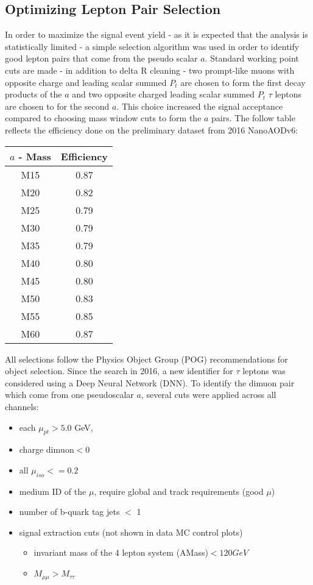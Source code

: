 \subsection{Optimizing Lepton Pair Selection}
In order to maximize the signal event yield - as it is expected that the analysis is statistically limited - a simple selection algorithm was used in order to identify good lepton pairs that come from the pseudo scalar $a$. Standard working point cuts are made - in addition to delta R cleaning - two prompt-like muons with opposite charge and leading scalar summed $P_t$ are chosen to form the first decay products of the $a$ and two opposite charged leading scalar summed $P_t$ $\tau$ leptons are chosen to for the second $a$. This choice increased the signal acceptance compared to choosing mass window cuts to form the $a$ pairs. The follow table reflects the efficiency done on the preliminary dataset from 2016 NanoAODv6:
\begin{center}
\begin{tabular}{|c|c|}\hline
$a$ - Mass & Efficiency \\\hline
M15 & 0.87 \\\hline
M20 & 0.82 \\\hline
M25 & 0.79 \\\hline
M30 & 0.79 \\\hline
M35 & 0.79 \\\hline
M40 & 0.80 \\\hline
M45 & 0.80 \\\hline
M50 & 0.83 \\\hline
M55 & 0.85 \\\hline
M60 & 0.87 \\\hline
\end{tabular}
\end{center}

All selections follow the Physics Object Group (POG) recommendations for object selection.
Since the search in 2016, a new identifier for $\tau$ leptons was considered using a Deep Neural Network (DNN).
To identify the dimuon pair which come from one pseudoscalar $a$, several cuts were applied across all channels:
\begin{itemize}
    \item each $\mu_{pt} > 5.0$ GeV,
    \item charge $\text{dimuon} < 0$
    \item all $\mu_{iso}<=0.2$
    \item medium ID of the $\mu$, require global and track requirements (good $\mu$)
    \item number of b-quark tag jets $<$ 1 
    \item signal extraction cuts (not shown in data MC control plots)
    \begin{itemize}
    \item invariant mass of the 4 lepton system (AMass)$<120GeV$ 
    \item $M_{\mu\mu} > M_{\tau\tau}$   
    \end{itemize}
\end{itemize}


